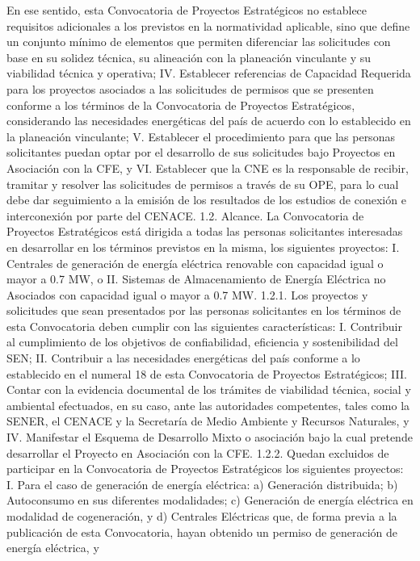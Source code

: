En ese sentido, esta Convocatoria de Proyectos Estratégicos no establece requisitos adicionales a los previstos en la normatividad aplicable, sino que define un conjunto mínimo de elementos que permiten diferenciar las solicitudes con base en su solidez técnica, su alineación con la planeación vinculante y su viabilidad técnica y operativa;
IV. Establecer referencias de Capacidad Requerida para los proyectos asociados a las solicitudes de permisos que se presenten conforme a los términos de la Convocatoria de Proyectos Estratégicos, considerando las necesidades energéticas del país de acuerdo con lo establecido en la planeación vinculante;
V. Establecer el procedimiento para que las personas solicitantes puedan optar por el desarrollo de sus solicitudes bajo Proyectos en Asociación con la CFE, y
VI. Establecer que la CNE es la responsable de recibir, tramitar y resolver las solicitudes de permisos a través de su OPE, para lo cual debe dar seguimiento a la emisión de los resultados de los estudios de conexión e interconexión por parte del CENACE.
1.2. Alcance. La Convocatoria de Proyectos Estratégicos está dirigida a todas las personas solicitantes interesadas en desarrollar en los términos previstos en la misma, los siguientes proyectos:
I. Centrales de generación de energía eléctrica renovable con capacidad igual o mayor a 0.7 MW, o
II. Sistemas de Almacenamiento de Energía Eléctrica no Asociados con capacidad igual o mayor a 0.7 MW.
1.2.1. Los proyectos y solicitudes que sean presentados por las personas solicitantes en los términos de esta Convocatoria deben cumplir con las siguientes características:
I. Contribuir al cumplimiento de los objetivos de confiabilidad, eficiencia y sostenibilidad del SEN;
II. Contribuir a las necesidades energéticas del país conforme a lo establecido en el numeral 18 de esta Convocatoria de Proyectos Estratégicos;
III. Contar con la evidencia documental de los trámites de viabilidad técnica, social y ambiental efectuados, en su caso, ante las autoridades competentes, tales como la SENER, el CENACE y la Secretaría de Medio Ambiente y Recursos Naturales, y
IV. Manifestar el Esquema de Desarrollo Mixto o asociación bajo la cual pretende desarrollar el Proyecto en Asociación con la CFE.
1.2.2. Quedan excluidos de participar en la Convocatoria de Proyectos Estratégicos los siguientes proyectos:
I. Para el caso de generación de energía eléctrica:
a) Generación distribuida;
b) Autoconsumo en sus diferentes modalidades;
c) Generación de energía eléctrica en modalidad de cogeneración, y
d) Centrales Eléctricas que, de forma previa a la publicación de esta Convocatoria, hayan obtenido un permiso de generación de energía eléctrica, y 

